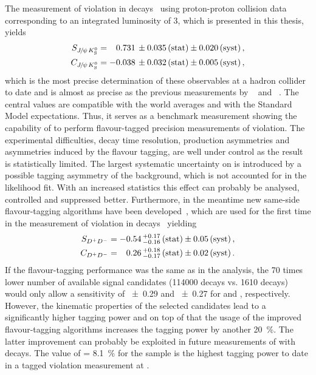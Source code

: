 The measurement of \CP violation in \BdToJPsiKS
decays~\cite{LHCb-PAPER-2015-004} using proton-proton collision data
corresponding to an integrated luminosity of \SI{3}{\invfb}, which is
presented in this thesis, yields
\begin{align*}
  S_{{{J\mskip -3mu/\mskip -2mu\psi\mskip 2mu}}{{K}^0_{\mathrm{ \scriptscriptstyle S}}}} &=  \phantom{-}0.731 \, \pm 0.035 \, \text{(stat)} \pm 0.020 \, \text{(syst)}\,, \\
  C_{{{J\mskip -3mu/\mskip -2mu\psi\mskip 2mu}}{{K}^0_{\mathrm{ \scriptscriptstyle S}}}} &=  			- 0.038 \, \pm 0.032 \, \text{(stat)} \pm 0.005 \, \text{(syst)}\,,
\end{align*}
which is the most precise determination of these \CP observables at a hadron
collider to date and is almost as precise as the previous measurements by
\babar~\cite{BaBar_sin2beta} and \belle~\cite{Belle_sin2beta}. The central
values are compatible with the world averages and with the Standard Model
expectations. Thus, it serves as a benchmark measurement showing the
capability of \lhcb to perform flavour-tagged precision measurements of \CP
violation. The experimental difficulties, \eg decay time resolution,
production asymmetries and asymmetries induced by the flavour tagging, are
well under control as the result is statistically limited. The largest
systematic uncertainty on \SJpsiKS is introduced by a possible tagging
asymmetry of the background, which is not accounted for in the likelihood fit.
With an increased statistics this effect can probably be analysed, controlled
and suppressed better. Furthermore, in the meantime new same-side
flavour-tagging algorithms have been developed~\cite{LHCb-PAPER-2016-039},
which are used for the first time in the measurement of \CP violation in
\BdToDD decays~\cite{LHCb-PAPER-2016-037} yielding
\begin{align*}
  S_{{{D}^+}{{D}^-}} &=  -0.54 \, ^{+0.17}_{-0.16} \, \text{(stat)} \pm 0.05 \, \text{(syst)}\,, \\
  C_{{{D}^+}{{D}^-}} &=  \phantom{-}0.26 \, ^{+0.18}_{-0.17} \, \text{(stat)} \pm 0.02 \, \text{(syst)}\,.
\end{align*}
If the flavour-tagging performance was the same as in the \BdToJPsiKS
analysis, the 70 times lower number of available signal candidates
(\num{114000} \BdToJPsiKS decays vs. \num{1610} \BdToDD decays) would only
allow a sensitivity of \num{\pm0.29} and \num{\pm0.27} for \SDD and
\CDD, respectively. However, the kinematic properties of the selected \BdToDD
candidates lead to a significantly higher tagging power and on top of that the
usage of the improved flavour-tagging algorithms increases the tagging power
by another \SI{20}{\percent}. The latter improvement can probably be exploited
in future measurements of \sintwobeta with \BdToJPsiKS decays. The value of
\effeff = \SI{8.1}{\percent} for the \BdToDD sample is the highest tagging
power to date in a tagged \CP violation measurement at \lhcb.

